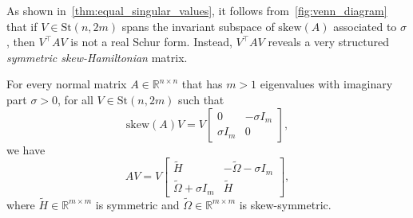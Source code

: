 \documentclass[10pt,twoside,dvipsnames]{siamart1116}
\numberwithin{algorithm}{section}
\numberwithin{equation}{section}
\begin{document}
As shown in~\cref{thm:equal_singular_values}, it follows from~\cref{fig:venn_diagram} that if $V\in\mathrm{St}(n,2m)$ spans the invariant subspace of $\mathrm{skew}(A)$ associated to $\sigma$, then $V^\top AV$ is not a real Schur form. Instead, $V^\top AV$  reveals a very structured \emph{symmetric skew-Hamiltonian} matrix.
\begin{theorem}\label{thm:equal_singular_values}
For every normal matrix $A\in\mathbb{R}^{n\times n}$ that has $m> 1$ eigenvalues with imaginary part $\sigma>0$, for all $V\in\mathrm{St}(n, 2m)$ such that 
	\begin{equation}
	\nonumber
		\mathrm{skew}(A)V = V\begin{bmatrix}
	0&-\sigma I_m\\
	\sigma I_m&0
	\end{bmatrix},
	\end{equation}
 we have
	\begin{equation}
	\nonumber
	 AV = V\begin{bmatrix}
	\widetilde{H}&-\widetilde{\Omega}-\sigma I_m\\
	\widetilde{\Omega}+\sigma I_m&\widetilde{H}
	\end{bmatrix},
	\end{equation}
	where $\widetilde{H}\in\mathbb{R}^{m\times m}$ is symmetric and $\widetilde{\Omega}\in\mathbb{R}^{m\times m}$ is skew-symmetric.
	\end{theorem}
\end{document}
